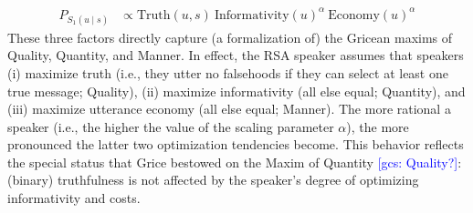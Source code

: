 \documentclass{sp}
\newcommand{\gcs}[1]{\textcolor{blue}{[gcs: #1]}}
\newcommand{\sem}[1]{\ensuremath{[\![#1]\!]}}
\begin{document}
\begin{align} \label{eq:S1-three-factor-formulation}
  P_{S_1(u\mid s)}   & \propto \text{Truth}(u,s) \ \text{Informativity}(u)^{\alpha} \ \text{Economy}(u)^{\alpha} %
\end{align}
These three factors directly capture (a formalization of) the Gricean maxims of Quality,
Quantity, and Manner. In effect, the RSA speaker assumes that speakers (i) maximize truth
(i.e., they utter no falsehoods if they can select at least one
true message; Quality), (ii) maximize informativity (all else equal; Quantity), and (iii) maximize utterance
economy (all else equal; Manner). The more rational a speaker (i.e., the higher the value of the scaling parameter $\alpha$), the more
pronounced the latter two optimization tendencies become. This behavior reflects the special
status that Grice bestowed on the Maxim of Quantity \gcs{Quality?}: (binary) truthfulness is not affected by
the speaker's degree of optimizing informativity and costs.
\end{document}
